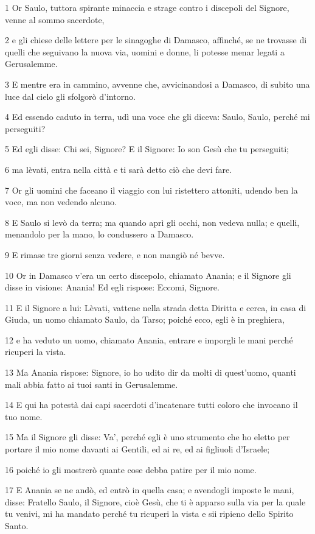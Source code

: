 \par 1 Or Saulo, tuttora spirante minaccia e strage contro i discepoli del Signore, venne al sommo sacerdote,
\par 2 e gli chiese delle lettere per le sinagoghe di Damasco, affinché, se ne trovasse di quelli che seguivano la nuova via, uomini e donne, li potesse menar legati a Gerusalemme.
\par 3 E mentre era in cammino, avvenne che, avvicinandosi a Damasco, di subito una luce dal cielo gli sfolgorò d'intorno.
\par 4 Ed essendo caduto in terra, udì una voce che gli diceva: Saulo, Saulo, perché mi perseguiti?
\par 5 Ed egli disse: Chi sei, Signore? E il Signore: Io son Gesù che tu perseguiti;
\par 6 ma lèvati, entra nella città e ti sarà detto ciò che devi fare.
\par 7 Or gli uomini che faceano il viaggio con lui ristettero attoniti, udendo ben la voce, ma non vedendo alcuno.
\par 8 E Saulo si levò da terra; ma quando aprì gli occhi, non vedeva nulla; e quelli, menandolo per la mano, lo condussero a Damasco.
\par 9 E rimase tre giorni senza vedere, e non mangiò né bevve.
\par 10 Or in Damasco v'era un certo discepolo, chiamato Anania; e il Signore gli disse in visione: Anania! Ed egli rispose: Eccomi, Signore.
\par 11 E il Signore a lui: Lèvati, vattene nella strada detta Diritta e cerca, in casa di Giuda, un uomo chiamato Saulo, da Tarso; poiché ecco, egli è in preghiera,
\par 12 e ha veduto un uomo, chiamato Anania, entrare e imporgli le mani perché ricuperi la vista.
\par 13 Ma Anania rispose: Signore, io ho udito dir da molti di quest'uomo, quanti mali abbia fatto ai tuoi santi in Gerusalemme.
\par 14 E qui ha potestà dai capi sacerdoti d'incatenare tutti coloro che invocano il tuo nome.
\par 15 Ma il Signore gli disse: Va', perché egli è uno strumento che ho eletto per portare il mio nome davanti ai Gentili, ed ai re, ed ai figliuoli d'Israele;
\par 16 poiché io gli mostrerò quante cose debba patire per il mio nome.
\par 17 E Anania se ne andò, ed entrò in quella casa; e avendogli imposte le mani, disse: Fratello Saulo, il Signore, cioè Gesù, che ti è apparso sulla via per la quale tu venivi, mi ha mandato perché tu ricuperi la vista e sii ripieno dello Spirito Santo.
